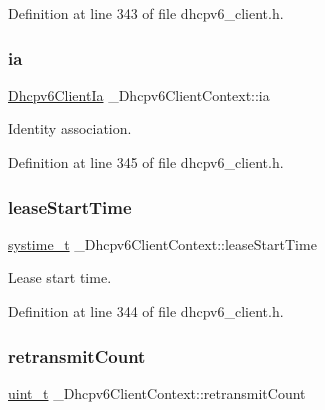 Definition at line 343 of file dhcpv6\+\_\+client.\+h.

\mbox{\label{struct__Dhcpv6ClientContext_a976e8fd27765311dca2c9b0fd320b365}} 
\subsubsection{\texorpdfstring{ia}{ia}}
{\footnotesize\ttfamily \hyperlink{structDhcpv6ClientIa}{Dhcpv6\+Client\+Ia} \+\_\+\+Dhcpv6\+Client\+Context\+::ia}



Identity association. 



Definition at line 345 of file dhcpv6\+\_\+client.\+h.

\mbox{\label{struct__Dhcpv6ClientContext_ab7c7ed18fe35758cfce3441b01f10117}} 
\subsubsection{\texorpdfstring{lease\+Start\+Time}{leaseStartTime}}
{\footnotesize\ttfamily \hyperlink{compiler__port_8h_ae3e32a98d431a02106616da3071832dd}{systime\+\_\+t} \+\_\+\+Dhcpv6\+Client\+Context\+::lease\+Start\+Time}



Lease start time. 



Definition at line 344 of file dhcpv6\+\_\+client.\+h.

\mbox{\label{struct__Dhcpv6ClientContext_ae2898d84cdbbf5836370c4f124133daf}} 
\subsubsection{\texorpdfstring{retransmit\+Count}{retransmitCount}}
{\footnotesize\ttfamily \hyperlink{compiler__port_8h_a12a1e9b3ce141648783a82445d02b58d}{uint\+\_\+t} \+\_\+\+Dhcpv6\+Client\+Context\+::retransmit\+Count}



